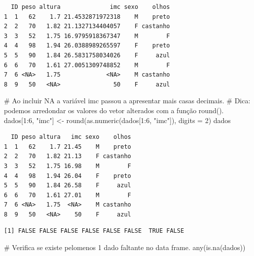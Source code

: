 \documentclass[
  letterpaper,
  DIV=11,
  numbers=noendperiod]{scrreprt}
\newenvironment{Shaded}{\begin{snugshade}}{\end{snugshade}}
\newcommand{\AttributeTok}[1]{\textcolor[rgb]{0.40,0.45,0.13}{#1}}
\newcommand{\CommentTok}[1]{\textcolor[rgb]{0.37,0.37,0.37}{#1}}
\newcommand{\DecValTok}[1]{\textcolor[rgb]{0.68,0.00,0.00}{#1}}
\newcommand{\FunctionTok}[1]{\textcolor[rgb]{0.28,0.35,0.67}{#1}}
\newcommand{\NormalTok}[1]{\textcolor[rgb]{0.00,0.23,0.31}{#1}}
\newcommand{\OtherTok}[1]{\textcolor[rgb]{0.00,0.23,0.31}{#1}}
\newcommand{\SpecialCharTok}[1]{\textcolor[rgb]{0.37,0.37,0.37}{#1}}
\newcommand{\StringTok}[1]{\textcolor[rgb]{0.13,0.47,0.30}{#1}}
\begin{document}
\begin{verbatim}
  ID peso altura              imc sexo    olhos
1  1   62    1.7 21.4532871972318    M    preto
2  2   70   1.82 21.1327134404057    F castanho
3  3   52   1.75 16.9795918367347    M        F
4  4   98   1.94 26.0388989265597    F    preto
5  5   90   1.84 26.5831758034026    F     azul
6  6   70   1.61 27.0051309748852    M        F
7  6 <NA>   1.75             <NA>    M castanho
8  9   50   <NA>               50    F     azul
\end{verbatim}

\begin{Shaded}
\begin{Highlighting}[]
\CommentTok{\# Ao incluir NA a variável imc passou a apresentar mais casas decimais.}
\CommentTok{\# Dica: podemos arredondar os valores do vetor alterados com a função round().}
\NormalTok{dados[}\DecValTok{1}\SpecialCharTok{:}\DecValTok{6}\NormalTok{, }\StringTok{"imc"}\NormalTok{] }\OtherTok{\textless{}{-}} \FunctionTok{round}\NormalTok{(}\FunctionTok{as.numeric}\NormalTok{(dados[}\DecValTok{1}\SpecialCharTok{:}\DecValTok{6}\NormalTok{, }\StringTok{"imc"}\NormalTok{]), }\AttributeTok{digits =} \DecValTok{2}\NormalTok{) }
\NormalTok{dados}
\end{Highlighting}
\end{Shaded}

\begin{verbatim}
  ID peso altura   imc sexo    olhos
1  1   62    1.7 21.45    M    preto
2  2   70   1.82 21.13    F castanho
3  3   52   1.75 16.98    M        F
4  4   98   1.94 26.04    F    preto
5  5   90   1.84 26.58    F     azul
6  6   70   1.61 27.01    M        F
7  6 <NA>   1.75  <NA>    M castanho
8  9   50   <NA>    50    F     azul
\end{verbatim}

\begin{Shaded}
\end{Shaded}

\begin{verbatim}
[1] FALSE FALSE FALSE FALSE FALSE FALSE  TRUE FALSE
\end{verbatim}

\begin{Shaded}
\begin{Highlighting}[]
\CommentTok{\# Verifica se existe pelomenos 1 dado faltante no data frame.}
\FunctionTok{any}\NormalTok{(}\FunctionTok{is.na}\NormalTok{(dados))}
\end{Highlighting}
\end{Shaded}
\end{document}
